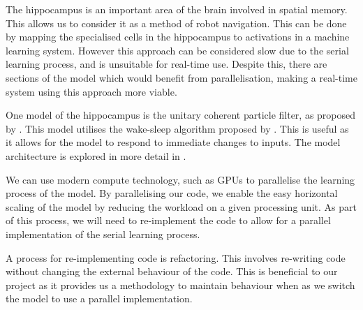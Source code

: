 

The hippocampus is an important area of the brain involved in spatial memory. 
This allows us to consider it as a method of robot navigation. 
This can be done by mapping the specialised cells in the hippocampus to activations in a machine learning system.
However this approach can be considered slow due to the serial learning process, and is unsuitable for real-time use.
Despite this, there are sections of the model which would benefit from parallelisation, making a real-time system using this approach more viable.

One model of the hippocampus is the unitary coherent particle filter, as proposed by \cite{foxandprescott2010A}. 
This model utilises the wake-sleep algorithm proposed by \cite{hintonDBN2006}.
This is useful as it allows for the model to respond to immediate changes to inputs. %
The model architecture %
is explored in more detail in  .

We can use modern compute technology, such as GPUs to parallelise the learning process of the model. 
By parallelising our code, we enable the easy horizontal scaling of the model by reducing the workload on a given processing unit. 
As part of this process, we will need to re-implement the code to allow for a parallel implementation of the serial learning process.

A process for re-implementing code is refactoring.
This involves re-writing code without changing the external behaviour of the code.
This is beneficial to our project as it provides us a methodology to maintain behaviour when as we switch the model to use a parallel implementation.

